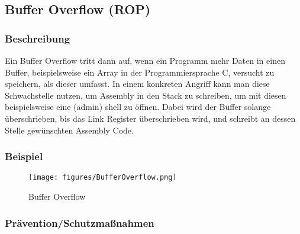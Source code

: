 \documentclass[a4paper,
DIV=13,
12pt,
BCOR=10mm,
department=FakIM,
oneside,
parskip=half,
automark,
listof=totocnumbered,
bibliography=totocnumbered,
acronym=totocnumbered
] {OTHRartcl}
\begin{document}
\subsection{Buffer Overflow (ROP)}
\subsubsection{Beschreibung}
Ein Buffer Overflow tritt dann auf, wenn ein Programm mehr Daten in einen Buffer, beispielsweise ein Array in der Programmiersprache C, versucht zu speichern, als
dieser umfasst.
In einem konkreten Angriff kann man diese Schwachstelle nutzen, um Assembly in den Stack zu schreiben, um mit diesen beispielsweise eine (admin) shell zu öffnen.
Dabei wird der Buffer solange überschrieben, bis das Link Register überschrieben wird, und schreibt an dessen Stelle gewünschten Assembly Code.


\subsubsection{Beispiel}
\begin{figure}[ht!]
  \begin{center}
    \texttt{[image: figures/BufferOverflow.png]}
    \caption{Buffer Overflow}
    \label{Abbildung 1: Buffer Overflow}
  \end{center}
\end{figure}


\subsubsection{Prävention/Schutzmaßnahmen}



\newpage
\end{document}
